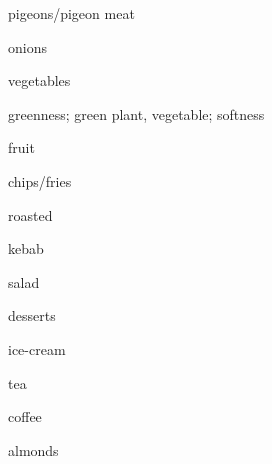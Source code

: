 \documentclass[avery5371,grid,frame]{flashcards}
\begin{document}
\begin{flashcard}{\LARGE pigeons/pigeon meat}
\LARGE {}
\end{flashcard}
\begin{flashcard}{\LARGE onions}
\LARGE {}
\end{flashcard}
\begin{flashcard}{\LARGE vegetables}
\LARGE {}
\end{flashcard}
\begin{flashcard}{\LARGE greenness; green plant, vegetable; softness}
\LARGE {}
\end{flashcard}
\begin{flashcard}{\LARGE fruit}
\LARGE {}
\end{flashcard}
\begin{flashcard}{\LARGE chips/fries}
\LARGE {}
\end{flashcard}
\begin{flashcard}{\LARGE roasted}
\LARGE {}
\end{flashcard}
\begin{flashcard}{\LARGE kebab}
\LARGE {}
\end{flashcard}
\begin{flashcard}{\LARGE salad}
\LARGE {}
\end{flashcard}
\begin{flashcard}{\LARGE desserts}
\LARGE {}
\end{flashcard}
\begin{flashcard}{\LARGE ice-cream}
\LARGE {}
\end{flashcard}
\begin{flashcard}{\LARGE tea}
\LARGE {}
\end{flashcard}
\begin{flashcard}{\LARGE coffee}
\LARGE {}
\end{flashcard}
\begin{flashcard}{\LARGE almonds}
\LARGE {}
\end{flashcard}
\end{document}
